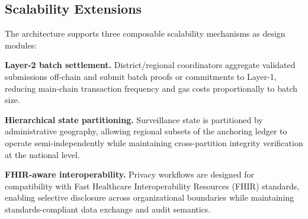%
%
%
%
%
%
%

\subsection{Scalability Extensions}\label{subsec:scalability}

The architecture supports three composable scalability mechanisms as design modules:

\textbf{Layer-2 batch settlement.} District/regional coordinators aggregate validated submissions off-chain and submit batch proofs or commitments to Layer-1, reducing main-chain transaction frequency and gas costs proportionally to batch size.

\textbf{Hierarchical state partitioning.} Surveillance state is partitioned by administrative geography, allowing regional subsets of the anchoring ledger to operate semi-independently while maintaining cross-partition integrity verification at the national level.

\textbf{FHIR-aware interoperability.} Privacy workflows are designed for compatibility with Fast Healthcare Interoperability Resources (FHIR) standards, enabling selective disclosure across organizational boundaries while maintaining standards-compliant data exchange and audit semantics.



